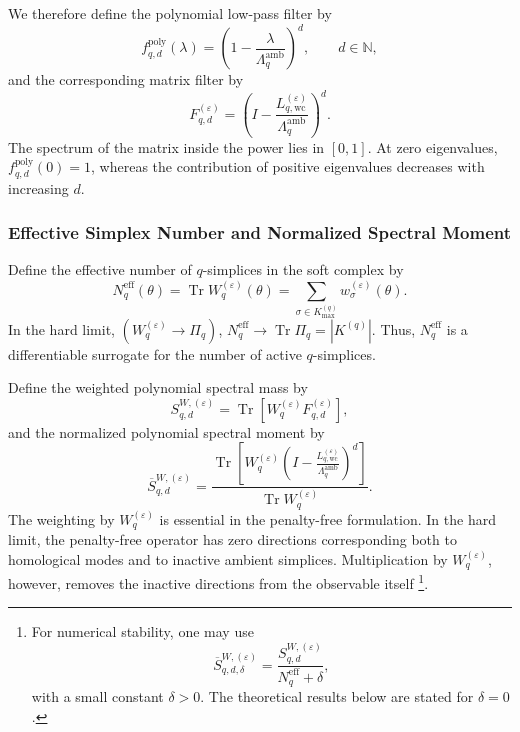 \documentclass[pdflatex,sn-mathphys-num]{sn-jnl}%
\theoremstyle{thmstyleone}%
\theoremstyle{thmstyletwo}%
\theoremstyle{thmstylethree}%
\begin{document}
We therefore define the polynomial low-pass filter by
\[
f_{q,d}^{\mathrm{poly}}(\lambda)
=
\left(
1-
\frac{\lambda}
{\Lambda_q^{\mathrm{amb}}}
\right)^d,
\qquad
d\in\mathbb N,
\]
and the corresponding matrix filter by
\[
F_{q,d}^{(\varepsilon)}
=
\left(
I-
\frac{
L_{q,\mathrm{wc}}^{(\varepsilon)}
}{
\Lambda_q^{\mathrm{amb}}
}
\right)^d.
\]
The spectrum of the matrix inside the power lies in \([0,1]\).
At zero eigenvalues,
$f_{q,d}^{\mathrm{poly}}(0)=1$,
whereas the contribution of positive eigenvalues decreases with increasing \(d\).


\subsubsection{Effective Simplex Number and Normalized Spectral Moment}

Define the effective number of \(q\)-simplices in the soft complex by
\[
N_q^{\mathrm{eff}}(\theta)
=
\operatorname{Tr}
W_q^{(\varepsilon)}(\theta)
=
\sum_{\sigma\in K_{\max}^{(q)}}
w_\sigma^{(\varepsilon)}(\theta).
\]
In the hard limit, $(W_q^{(\varepsilon)}
\longrightarrow
\Pi_q)$,
$N_q^{\mathrm{eff}}
\longrightarrow
\operatorname{Tr}\Pi_q
=
|K^{(q)}|$.
Thus, \(N_q^{\mathrm{eff}}\) is a differentiable surrogate for the number of active \(q\)-simplices.

Define the weighted polynomial spectral mass by
\[
S_{q,d}^{W,(\varepsilon)}
=
\operatorname{Tr}
\left[
W_q^{(\varepsilon)}
F_{q,d}^{(\varepsilon)}
\right],
\]
and the normalized polynomial spectral moment by
\[
\overline S_{q,d}^{W,(\varepsilon)}
=
\frac{
\operatorname{Tr}
\left[
W_q^{(\varepsilon)}
\left(
I-
\frac{
L_{q,\mathrm{wc}}^{(\varepsilon)}
}{
\Lambda_q^{\mathrm{amb}}
}
\right)^d
\right]
}{
\operatorname{Tr}
W_q^{(\varepsilon)}
}.
\]
The weighting by \(W_q^{(\varepsilon)}\) is essential in the penalty-free formulation. In the hard limit, the penalty-free operator has zero directions corresponding both to homological modes and to inactive ambient simplices. Multiplication by \(W_q^{(\varepsilon)}\), however, removes the inactive directions from the observable itself
\footnote{
For numerical stability, one may use
\[
\overline S_{q,d,\delta}^{W,(\varepsilon)}
=
\frac{
S_{q,d}^{W,(\varepsilon)}
}{
N_q^{\mathrm{eff}}+\delta
},
\]
with a small constant \(\delta>0\). The theoretical results below are stated for \(\delta=0\).
}.
\end{document}

